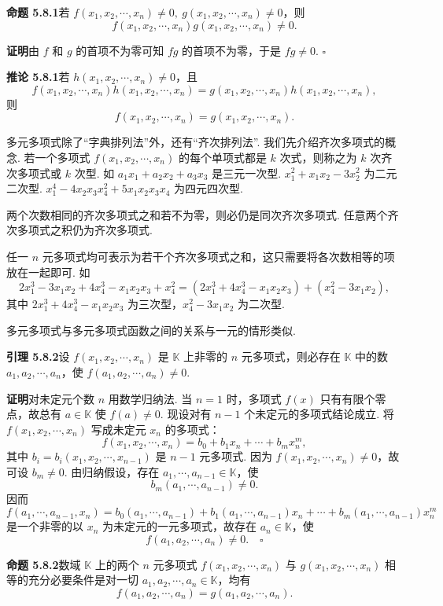 \documentclass[UTF8,12pt,a4paper,fontset=fandol]{ctexart}
\begin{document}
\noindent\textbf{命题 5.8.1}\quad 若 $f(x_1,x_2,\cdots,x_n)\neq 0,\ g(x_1,x_2,\cdots,x_n)\neq 0$，则
\[
f(x_1,x_2,\cdots,x_n)g(x_1,x_2,\cdots,x_n)\neq 0.
\]

\noindent\textbf{证明}\quad 由 $f$ 和 $g$ 的首项不为零可知 $fg$ 的首项不为零，于是 $fg\neq 0$. $\square$

\noindent\textbf{推论 5.8.1}\quad 若 $h(x_1,x_2,\cdots,x_n)\neq 0$，且
\[
f(x_1,x_2,\cdots,x_n)h(x_1,x_2,\cdots,x_n)=g(x_1,x_2,\cdots,x_n)h(x_1,x_2,\cdots,x_n),
\]
则
\[
f(x_1,x_2,\cdots,x_n)=g(x_1,x_2,\cdots,x_n).
\]

多元多项式除了“字典排列法”外，还有“齐次排列法”. 我们先介绍齐次多项式的概念. 若一个多项式 $f(x_1,x_2,\cdots,x_n)$ 的每个单项式都是 $k$ 次式，则称之为 $k$ 次齐次多项式或 $k$ 次型. 如 $a_1x_1+a_2x_2+a_3x_3$ 是三元一次型. $x_1^2+x_1x_2-3x_2^2$ 为二元二次型. $x_1^4-4x_2x_3x_4^2+5x_1x_2x_3x_4$ 为四元四次型.

两个次数相同的齐次多项式之和若不为零，则必仍是同次齐次多项式. 任意两个齐次多项式之积仍为齐次多项式.

任一 $n$ 元多项式均可表示为若干个齐次多项式之和，这只需要将各次数相等的项放在一起即可. 如
\[
2x_1^3-3x_1x_2+4x_4^3-x_1x_2x_3+x_4^2=(2x_1^3+4x_4^3-x_1x_2x_3)+(x_4^2-3x_1x_2),
\]
其中 $2x_1^3+4x_4^3-x_1x_2x_3$ 为三次型，$x_4^2-3x_1x_2$ 为二次型.

多元多项式与多元多项式函数之间的关系与一元的情形类似.

\noindent\textbf{引理 5.8.2}\quad 设 $f(x_1,x_2,\cdots,x_n)$ 是 $\mathbb{K}$ 上非零的 $n$ 元多项式，则必存在 $\mathbb{K}$ 中的数 $a_1,a_2,\cdots,a_n$，使 $f(a_1,a_2,\cdots,a_n)\neq 0$.

\noindent\textbf{证明}\quad 对未定元个数 $n$ 用数学归纳法. 当 $n=1$ 时，多项式 $f(x)$ 只有有限个零点，故总有 $a\in\mathbb{K}$ 使 $f(a)\neq 0$. 现设对有 $n-1$ 个未定元的多项式结论成立. 将 $f(x_1,x_2,\cdots,x_n)$ 写成未定元 $x_n$ 的多项式：
\[
f(x_1,x_2,\cdots,x_n)=b_0+b_1x_n+\cdots+b_mx_n^m,
\]
其中 $b_i=b_i(x_1,x_2,\cdots,x_{n-1})$ 是 $n-1$ 元多项式. 因为 $f(x_1,x_2,\cdots,x_n)\neq 0$，故可设 $b_m\neq 0$. 由归纳假设，存在 $a_1,\cdots,a_{n-1}\in\mathbb{K}$，使
\[
b_m(a_1,\cdots,a_{n-1})\neq 0.
\]
因而
\[
f(a_1,\cdots,a_{n-1},x_n)=b_0(a_1,\cdots,a_{n-1})+b_1(a_1,\cdots,a_{n-1})x_n+\cdots+b_m(a_1,\cdots,a_{n-1})x_n^m
\]
是一个非零的以 $x_n$ 为未定元的一元多项式，故存在 $a_n\in\mathbb{K}$，使
\[
f(a_1,a_2,\cdots,a_n)\neq 0.\quad \square
\]

\noindent\textbf{命题 5.8.2}\quad 数域 $\mathbb{K}$ 上的两个 $n$ 元多项式 $f(x_1,x_2,\cdots,x_n)$ 与 $g(x_1,x_2,\cdots,x_n)$ 相等的充分必要条件是对一切 $a_1,a_2,\cdots,a_n\in\mathbb{K}$，均有
\[
f(a_1,a_2,\cdots,a_n)=g(a_1,a_2,\cdots,a_n).
\]
\end{document}
